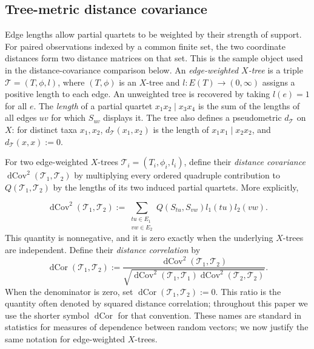 \documentclass[12pt]{article}
\DeclareMathOperator{\dCov}{dCov}
\DeclareMathOperator{\dCor}{dCor}
\begin{document}
\subsection{Tree-metric distance covariance}

Edge lengths allow partial quartets to be weighted by their strength of
support.  For paired observations indexed by a common finite set, the two
coordinate distances form two distance matrices on that set.  This is the
sample object used in the distance-covariance comparison below.  An
\emph{edge-weighted $X$-tree} is a triple $\mathcal T=(T,\phi,l)$, where
$(T,\phi)$ is an $X$-tree and $l:E(T)\to(0,\infty)$ assigns a positive
length to each edge.  An unweighted tree is recovered by taking
$l(e)=1$ for all $e$.  The \emph{length} of a partial quartet
$x_1x_2\mid x_3x_4$ is the sum of the lengths of all edges $uv$ for
which $S_{uv}$ displays it.  The tree also defines a pseudometric
$d_{\mathcal T}$ on $X$: for distinct taxa $x_1,x_2$,
$d_{\mathcal T}(x_1,x_2)$ is the length of
$x_1x_1\mid x_2x_2$, and $d_{\mathcal T}(x,x):=0$.

For two edge-weighted $X$-trees
$\mathcal T_i=(T_i,\phi_i,l_i)$, define their \emph{distance covariance}
$\dCov^2(\mathcal T_1,\mathcal T_2)$ by multiplying every ordered
quadruple contribution to $Q(\mathcal T_1,\mathcal T_2)$ by the lengths
of its two induced partial quartets.  More explicitly,

\begin{equation}\label{eq:weighted-quartet-covariance}
\dCov^2(\mathcal T_1,\mathcal T_2)
:=\sum_{\substack{tu\in E_1\\vw\in E_2}}
Q(S_{tu},S_{vw})l_1(tu)l_2(vw).
\end{equation}
This quantity is nonnegative, and it is zero exactly when the underlying
$X$-trees are independent.  Define their \emph{distance correlation} by
\begin{equation}\label{eq:tree-distance-correlation}
\dCor(\mathcal T_1,\mathcal T_2):=
\frac{\dCov^2(\mathcal T_1,\mathcal T_2)}
{\sqrt{\dCov^2(\mathcal T_1,\mathcal T_1)
\dCov^2(\mathcal T_2,\mathcal T_2)}}.
\end{equation}
When the denominator is zero, set
$\dCor(\mathcal T_1,\mathcal T_2):=0$.
This ratio is the quantity often denoted by squared distance correlation;
throughout this paper we use the shorter symbol $\dCor$ for that convention.
These names are standard in statistics for measures of dependence
between random vectors; we now justify the same notation for
edge-weighted $X$-trees.
\end{document}

